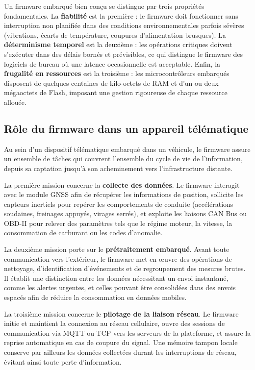 Un firmware embarqué bien conçu se distingue par trois propriétés
fondamentales. La \textbf{fiabilité} est la première : le firmware doit
fonctionner sans interruption non planifiée dans des conditions
environnementales parfois sévères (vibrations, écarts de température,
coupures d'alimentation brusques). La \textbf{déterminisme temporel} est
la deuxième : les opérations critiques doivent s'exécuter dans des délais
bornés et prévisibles, ce qui distingue le firmware des logiciels de bureau
où une latence occasionnelle est acceptable. Enfin, la \textbf{frugalité
en ressources} est la troisième : les microcontrôleurs embarqués disposent
de quelques centaines de kilo-octets de RAM et d'un ou deux mégaoctets de
Flash, imposant une gestion rigoureuse de chaque ressource allouée.

\subsection{Rôle du firmware dans un appareil télématique}
\label{subsec:role_fw}

Au sein d'un dispositif télématique embarqué dans un véhicule, le firmware
assure un ensemble de tâches qui couvrent l'ensemble du cycle de vie de
l'information, depuis sa captation jusqu'à son acheminement vers
l'infrastructure distante.

La première mission concerne la \textbf{collecte des données}. Le firmware
interagit avec le module GNSS afin de récupérer les informations de
position, sollicite les capteurs inertiels pour repérer les comportements de
conduite (accélérations soudaines, freinages appuyés, virages serrés), et
exploite les liaisons CAN Bus ou OBD-II pour relever des paramètres tels que
le régime moteur, la vitesse, la consommation de carburant ou les codes
d'anomalie.

La deuxième mission porte sur le \textbf{prétraitement embarqué}. Avant toute
communication vers l'extérieur, le firmware met en {\oe}uvre des opérations
de nettoyage, d'identification d'événements et de regroupement des mesures
brutes. Il établit une distinction entre les données nécessitant un envoi
instantané, comme les alertes urgentes, et celles pouvant être consolidées
dans des envois espacés afin de réduire la consommation en données mobiles.

La troisième mission concerne le \textbf{pilotage de la liaison réseau}. Le
firmware initie et maintient la connexion au réseau cellulaire, ouvre des
sessions de communication via MQTT ou TCP vers les serveurs de la
plateforme, et assure la reprise automatique en cas de coupure du signal.
Une mémoire tampon locale conserve par ailleurs les données collectées
durant les interruptions de réseau, évitant ainsi toute perte
d'information.

